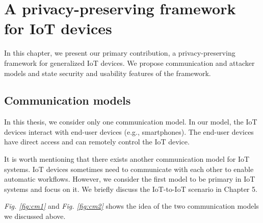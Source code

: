 \chapter{A privacy-preserving framework for IoT devices}

In this chapter, we present our primary contribution, a privacy-preserving framework for generalized IoT devices. We propose communication and attacker models and state security and usability features of the framework.

\section{Communication models}

In this thesis, we consider only one communication model. In our model, the IoT devices interact with end-user devices (e.g., smartphones). The end-user devices have direct access and can remotely control the IoT device.

It is worth mentioning that there exists another communication model for IoT systems. IoT devices sometimes need to communicate with each other to enable automatic workflows. However, we consider the first model to be primary in IoT systems and focus on it. We briefly discuss the IoT-to-IoT scenario in Chapter 5. 

\textit{Fig. \ref{fig:cm1}} and \textit{Fig. \ref{fig:cm2}} shows the idea of the two communication models we discussed above. 



